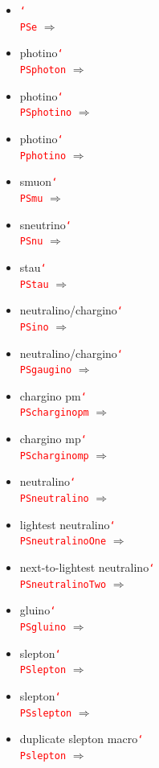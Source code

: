 \documentclass[12pt]{article}
\newcommand{\texcmd}[1]{\textcolor{red}{\texttt{\char`\\#1}}}
\begin{document}
\begin{multicols}{2}
{\begin{itemize}
\item  \texcmd{PSe} $\Rightarrow$ \PSe
\item photino\newline \texcmd{PSphoton} $\Rightarrow$ \PSphoton
\item photino\newline \texcmd{PSphotino} $\Rightarrow$ \PSphotino
\item photino\newline \texcmd{Pphotino} $\Rightarrow$ \Pphotino
\item smuon\newline \texcmd{PSmu} $\Rightarrow$ \PSmu
\item sneutrino\newline \texcmd{PSnu} $\Rightarrow$ \PSnu
\item stau\newline \texcmd{PStau} $\Rightarrow$ \PStau
\item neutralino/chargino\newline \texcmd{PSino} $\Rightarrow$ \PSino
\item neutralino/chargino\newline \texcmd{PSgaugino} $\Rightarrow$ \PSgaugino
\item chargino pm\newline \texcmd{PScharginopm} $\Rightarrow$ \PScharginopm
\item chargino mp\newline \texcmd{PScharginomp} $\Rightarrow$ \PScharginomp
\item neutralino\newline \texcmd{PSneutralino} $\Rightarrow$ \PSneutralino
\item lightest neutralino\newline \texcmd{PSneutralinoOne} $\Rightarrow$ \PSneutralinoOne
\item next-to-lightest neutralino\newline \texcmd{PSneutralinoTwo} $\Rightarrow$ \PSneutralinoTwo
\item gluino\newline \texcmd{PSgluino} $\Rightarrow$ \PSgluino
\item slepton\newline \texcmd{PSlepton} $\Rightarrow$ \PSlepton
\item slepton\newline \texcmd{PSslepton} $\Rightarrow$ \PSslepton
\item duplicate slepton macro\newline \texcmd{Pslepton} $\Rightarrow$ \Pslepton

\end{itemize}}
\end{multicols}
\end{document}
